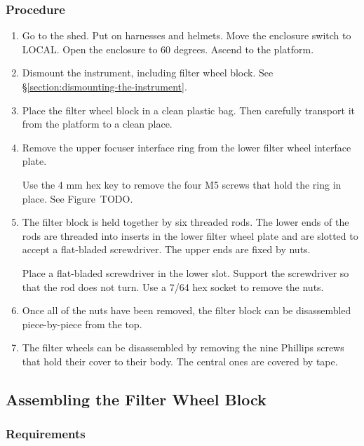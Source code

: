\subsubsection{Procedure}

\begin{enumerate}

    \item Go to the shed. Put on harnesses and helmets. Move the enclosure switch to LOCAL. Open the enclosure to 60 degrees. Ascend to the platform.

    \item Dismount the instrument, including filter wheel block. See \S\ref{section:dismounting-the-instrument}.

   \item Place the filter wheel block in a clean plastic bag. Then carefully transport it from the platform to a clean place.
   
   \item Remove the upper focuser interface ring from the lower filter wheel interface plate. 
   
   Use the 4 mm hex key to remove the four M5 screws that hold the ring in place. See Figure~TODO.
   
  \item The filter block is held together by six threaded rods. The lower ends of the rods are threaded into inserts in the lower filter wheel plate and are slotted to accept a flat-bladed screwdriver. The upper ends are fixed by nuts.
  
  Place a flat-bladed screwdriver in the lower slot. Support the screwdriver so that the rod does not turn. Use a 7/64 hex socket to remove the nuts.
  
  \item Once all of the nuts have been removed, the filter block can be disassembled piece-by-piece from the top.
  
 \item The filter wheels can be disassembled by removing the nine Phillips screws that hold their cover to their body. The central ones are covered by tape.
  
\end{enumerate}

\subsection{Assembling the Filter Wheel Block}

\subsubsection{Requirements}

